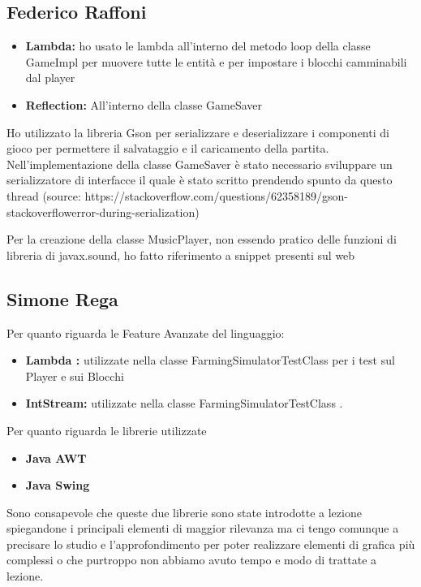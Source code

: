 \documentclass[a4paper,12pt]{report}
\begin{document}
\subsection{Federico Raffoni}

\begin{itemize}
	\item \textbf{Lambda:} ho usato le lambda all’interno del metodo loop della classe GameImpl per muovere tutte le entità e per impostare i blocchi camminabili dal player
	\item\textbf{Reflection:} All’interno della classe GameSaver
\end{itemize}

Ho utilizzato la libreria Gson per serializzare e deserializzare i componenti di gioco per permettere il salvataggio e il caricamento della partita.
Nell’implementazione della classe GameSaver è stato necessario sviluppare un serializzatore di interfacce il quale è stato scritto prendendo spunto da questo thread (source: https://stackoverflow.com/questions/62358189/gson-stackoverflowerror-during-serialization)

Per la creazione della classe MusicPlayer, non essendo pratico delle funzioni di libreria di javax.sound, ho fatto riferimento a snippet presenti sul web


\subsection{Simone Rega}
Per quanto riguarda le Feature Avanzate del linguaggio: 
\begin{itemize}
	\item \textbf{Lambda :} utilizzate nella classe FarmingSimulatorTestClass per i test sul Player e sui Blocchi	
	\item \textbf{IntStream: }utilizzate nella classe FarmingSimulatorTestClass .
\end{itemize}

\hfill\break
Per quanto riguarda le librerie utilizzate
\begin{itemize}
	\item \textbf{Java AWT }
	\item \textbf{Java Swing}
\end{itemize}
Sono consapevole che queste due librerie sono state introdotte a lezione spiegandone i principali elementi di maggior rilevanza ma ci tengo comunque a precisare lo studio e l'approfondimento per poter realizzare elementi di grafica più complessi o che purtroppo non abbiamo avuto tempo e  modo di trattate a lezione.
 
\end{document}
